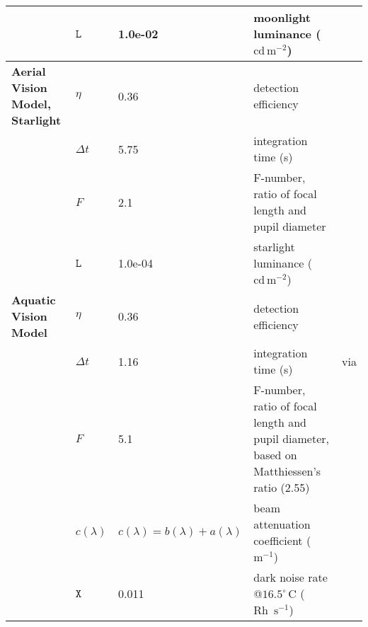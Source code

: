 \begin{tabular}{|L{3.5cm}|L{2cm}|L{2cm}|L{4.5cm}|L{4.5cm}|}
 &$\mathtt{L}$&1.0e-02&moonlight luminance ($\text{cd}\, \text{m}^{-2}$)&\cite{Midd52a}\\\hline
\textbf{Aerial Vision Model, Starlight}&$\eta$&0.36&detection efficiency&\cite{Nils14a}\\\hline
 &$\Delta t$&5.75&integration time (s)&\cite{Donn95a}\\\hline
 &$F$&2.1&F-number, ratio of focal length and pupil diameter&\cite{Mill79a}\\\hline
 &$\mathtt{L}$&1.0e-04&starlight luminance ($\text{cd}\, \text{m}^{-2}$)&\cite{Midd52a}\\\hline
\textbf{Aquatic Vision Model}&$\eta$&0.36&detection efficiency&\cite{Nils14a}\\\hline
 &$\Delta t$&1.16&integration time (s)&\cite{Donn95a} via \cite{Nils14a}\\\hline
 &$F$&5.1&F-number, ratio of focal length and pupil diameter, based on Matthiessen's ratio (2.55)&\cite{Nils14a}\\\hline
 &$c(\lambda)$&$c(\lambda)=b(\lambda)+a(\lambda)$&beam attenuation coefficient ($\text{m}^{-1}$)&\cite{Midd52a}\\\hline
 &$\mathtt{X}$&0.011&dark noise rate @$16.5^{\circ} \, \text{C}$ ($\text{Rh } \,\text{s}^{-1}$)&\cite{Aho93a}\\\hline
\end{tabular}

